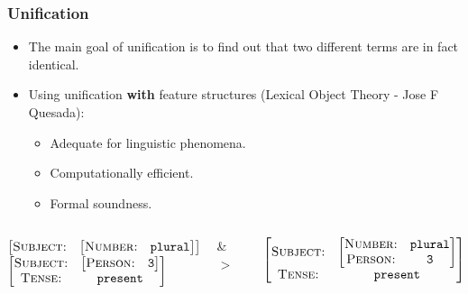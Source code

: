 \documentclass[11pt]{beamer}
\begin{document}
\begin{frame}
\frametitle{Unification}
\begin{itemize}
	\item The main goal of unification is to find out that two different terms are in fact identical.
	\pause 
	\item Using unification \textbf{with} feature structures (Lexical Object Theory - Jose F Quesada):
	\begin{itemize}
		\item Adequate for linguistic phenomena.
		\item Computationally efficient.
		\item Formal soundness.
	\end{itemize}
\end{itemize}
\pause
\vspace{15pt}
\begin{columns}
		\begin{column}{0.45\textwidth}
		\begin{scriptsize}
		$\begin{bmatrix}
				\textsc{Subject:}   & \begin{bmatrix}
																	\textsc{Number:} & \texttt{plural}\\ 
															\end{bmatrix}
		\end{bmatrix}$\\
		\vspace{10pt}
		$\begin{bmatrix}
				\textsc{Subject:}   & \begin{bmatrix}
																	\textsc{Person:} & \texttt{3}\\ 
															\end{bmatrix}\\
				\textsc{Tense:}     & \texttt{present}
														
		\end{bmatrix}$
		\end{scriptsize}
		\end{column}
		
		\begin{column}{0.1\textwidth}
		\pause
		\&$>$
		\end{column}
		
		\begin{column}{0.45\textwidth}
		\begin{scriptsize}
		$\begin{bmatrix}
				\textsc{Subject:}   & \begin{bmatrix}
																	\textsc{Number:} & \texttt{plural}\\ 
																	\textsc{Person:} & \texttt{3}\\ 
															\end{bmatrix}\\
				\textsc{Tense:}     & \texttt{present}
														
		\end{bmatrix}$
		\end{scriptsize}
		\end{column}
\end{columns}
\end{frame}
\end{document}
